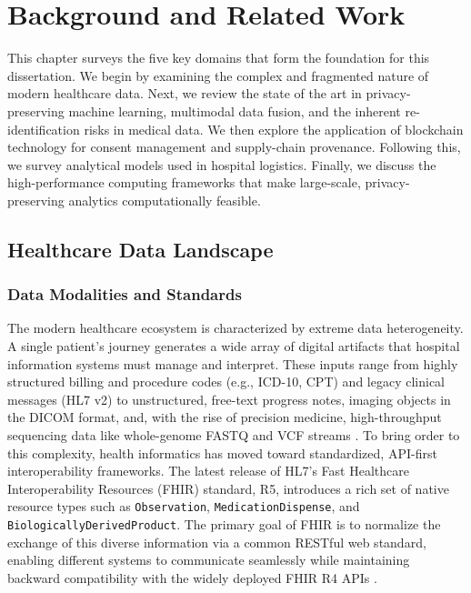 \documentclass[12pt]{report}
\begin{document}

\chapter{Background and Related Work}\label{chap:lit}

This chapter surveys the five key domains that form the foundation for this dissertation. We begin by examining the complex and fragmented nature of modern healthcare data. Next, we review the state of the art in privacy-preserving machine learning, multimodal data fusion, and the inherent re-identification risks in medical data. We then explore the application of blockchain technology for consent management and supply-chain provenance. Following this, we survey analytical models used in hospital logistics. Finally, we discuss the high-performance computing frameworks that make large-scale, privacy-preserving analytics computationally feasible.

\section{Healthcare Data Landscape}\label{sec:data_landscape}

\subsection{Data Modalities and Standards}
The modern healthcare ecosystem is characterized by extreme data heterogeneity. A single patient's journey generates a wide array of digital artifacts that hospital information systems must manage and interpret. These inputs range from highly structured billing and procedure codes (e.g., ICD-10, CPT) and legacy clinical messages (HL7 v2) to unstructured, free-text progress notes, imaging objects in the DICOM format, and, with the rise of precision medicine, high-throughput sequencing data like whole-genome FASTQ and VCF streams \cite{ONC2024Interop}. To bring order to this complexity, health informatics has moved toward standardized, API-first interoperability frameworks. The latest release of HL7's Fast Healthcare Interoperability Resources (FHIR) standard, R5, introduces a rich set of native resource types such as \texttt{Observation}, \texttt{MedicationDispense}, and \texttt{BiologicallyDerivedProduct}. The primary goal of FHIR is to normalize the exchange of this diverse information via a common RESTful web standard, enabling different systems to communicate seamlessly while maintaining backward compatibility with the widely deployed FHIR R4 APIs \cite{FHIRR5Resources}.
\end{document}

